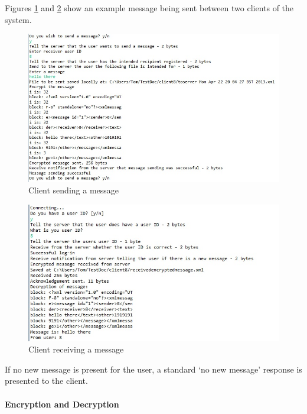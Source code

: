 \documentclass[a4paper,12pt]{report}
\begin{document}
Figures \ref{fig:clientsend1} and \ref{fig:clientsend2} show an example message being sent between two clients of the system.

\begin{figure}[!ht]
 \centering
 \includegraphics[scale=0.8]{images/screenshots/clientsend1.jpg}
 \caption{Client sending a message}
 \label{fig:clientsend1}
\end{figure}

\begin{figure}[!ht]
 \centering
 \includegraphics[scale=0.8]{images/screenshots/clientrec1.jpg}
 \caption{Client receiving a message}
 \label{fig:clientsend2}
\end{figure}

If no new message is present for the user, a standard ‘no new message’ response is presented to the client.

\paragraph{Encryption and Decryption}
\end{document}
